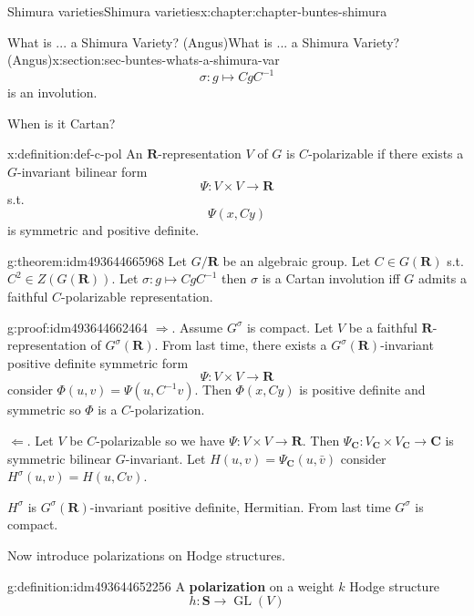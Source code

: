 \documentclass[oneside,10pt,]{book}
\newcommand{\terminology}[1]{\textbf{#1}}
\numberwithin{equation}{section}
\newcommand{\inv}{^{-1}}
\newcommand{\RR}{\mathbf{R}}
\newcommand{\CC}{\mathbf{C}}
\DeclareMathOperator{\GL}{GL}
\begin{document}
\begin{chapterptx}{Shimura varieties}{}{Shimura varieties}{}{}{x:chapter:chapter-buntes-shimura}
\begin{sectionptx}{What is ... a Shimura Variety? (Angus)}{}{What is ... a Shimura Variety? (Angus)}{}{}{x:section:sec-buntes-whats-a-shimura-var}
\begin{equation*}
\sigma \colon g \mapsto CgC\inv
\end{equation*}
is an involution.%
\par
When is it Cartan?%
\begin{definition}{}{x:definition:def-c-pol}%
An \(\RR\)-representation \(V\) of \(G\) is \(C\)-polarizable if there exists a \(G\)-invariant bilinear form%
\begin{equation*}
\Psi \colon V \times V \to \RR
\end{equation*}
s.t.%
\begin{equation*}
\Psi(x,Cy)
\end{equation*}
is symmetric and positive definite.%
\end{definition}
\begin{theorem}{}{}{g:theorem:idm493644665968}%
Let \(G/\RR\) be an algebraic group. Let \(C  \in G(\RR)\) s.t. \(C^2 \in Z(G(\RR))\). Let \(\sigma \colon g\mapsto Cg C\inv\)  then \(\sigma\) is a Cartan involution iff \(G\) admits a faithful \(C\)-polarizable representation.%
\end{theorem}
\begin{proofptx}{}{g:proof:idm493644662464}
\(\Rightarrow\). Assume \(G^\sigma \) is compact. Let \(V\) be a faithful \(\RR\)-representation of \(G^\sigma (\RR)\). From last time, there exists a \(G^\sigma(\RR)\)-invariant positive definite symmetric form%
\begin{equation*}
\Psi\colon V\times V\to \RR
\end{equation*}
consider \(\Phi(u,v) = \Psi(u, C\inv v)\). Then \(\Phi(x,Cy)\) is positive definite and symmetric so \(\Phi\) is a \(C\)-polarization.%
\par
\(\Leftarrow\). Let \(V\) be \(C\)-polarizable so we have \(\Psi \colon V\times V \to  \RR\). Then \(\Psi_\CC \colon V_\CC \times V_\CC \to \CC\) is symmetric bilinear \(G\)-invariant. Let \(H(u,v) = \Psi_\CC(u,\bar v)\) consider \(H^\sigma(u,v) = H(u,Cv)\).%
\par
\(H^\sigma\) is \(G^\sigma(\RR)\)-invariant positive definite, Hermitian. From last time \(G^\sigma\) is compact.%
\end{proofptx}
Now introduce polarizations on Hodge structures.%
\begin{definition}{}{g:definition:idm493644652256}%
A \terminology{polarization} on a weight \(k\) Hodge structure%
\begin{equation*}
h\colon \mathbf S \to \GL(V)
\end{equation*}
%
\begin{equation*}

\end{equation*}
\end{definition}
\end{sectionptx}
\end{chapterptx}
\end{document}
